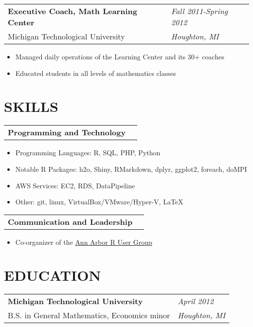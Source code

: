 \documentclass[margin,line]{res}
\begin{document}
\begin{resume}
\begin{tabular}{p{4.4in} l}
  {\bf Executive Coach, Math Learning Center } &  \emph{Fall 2011-Spring 2012}\\
  Michigan Technological University & \emph{Houghton, MI}
\end{tabular}
\vspace{1pt}
\begin{itemize}\itemsep -2pt %
  \item Managed daily operations of the Learning Center and its 30+ coaches
  \item Educated students in all levels of mathematics classes
\end{itemize}

\vspace{3pt}


\section{SKILLS}

\begin{tabular}{p{4.4in} l}
  {\bf Programming and Technology}
\end{tabular}
\vspace{2pt}
\begin{itemize} \itemsep -2pt
  \item Programming Languages: R, SQL, PHP, Python
  \item Notable R Packages: h2o, Shiny, RMarkdown, dplyr, ggplot2, foreach, doMPI
  \item AWS Services: EC2, RDS, DataPipeline
  \item Other: git, linux, VirtualBox/VMware/Hyper-V, \LaTeX
\end{itemize}

\begin{tabular}{p{4.4in} l}
  {\bf Communication and Leadership}
\end{tabular}
\vspace{2pt}
\begin{itemize} \itemsep -2pt
  \item Co-organizer of the \href{https://annarborrusergroup.github.io/}{Ann Arbor R User Group}
\end{itemize}

\vspace{3pt}


\section{EDUCATION}

\begin{tabular}{p{4.4in} l}
  {\bf Michigan Technological University} & \emph{April 2012} \\
  B.S. in General Mathematics, Economics minor & \emph{Houghton, MI} \\
\end{tabular}


\end{resume}
\end{document}
